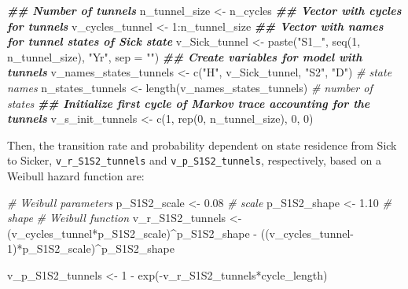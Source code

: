 \documentclass[
]{article}
\newenvironment{Shaded}{\begin{snugshade}}{\end{snugshade}}
\newcommand{\AttributeTok}[1]{\textcolor[rgb]{0.77,0.63,0.00}{#1}}
\newcommand{\CommentTok}[1]{\textcolor[rgb]{0.56,0.35,0.01}{\textit{#1}}}
\newcommand{\DecValTok}[1]{\textcolor[rgb]{0.00,0.00,0.81}{#1}}
\newcommand{\DocumentationTok}[1]{\textcolor[rgb]{0.56,0.35,0.01}{\textbf{\textit{#1}}}}
\newcommand{\FloatTok}[1]{\textcolor[rgb]{0.00,0.00,0.81}{#1}}
\newcommand{\FunctionTok}[1]{\textcolor[rgb]{0.00,0.00,0.00}{#1}}
\newcommand{\NormalTok}[1]{#1}
\newcommand{\OtherTok}[1]{\textcolor[rgb]{0.56,0.35,0.01}{#1}}
\newcommand{\SpecialCharTok}[1]{\textcolor[rgb]{0.00,0.00,0.00}{#1}}
\newcommand{\StringTok}[1]{\textcolor[rgb]{0.31,0.60,0.02}{#1}}
\begin{document}
\begin{Shaded}
\begin{Highlighting}[]
\DocumentationTok{\#\# Number of tunnels}
\NormalTok{n\_tunnel\_size }\OtherTok{\textless{}{-}}\NormalTok{ n\_cycles }
\DocumentationTok{\#\# Vector with cycles for tunnels}
\NormalTok{v\_cycles\_tunnel }\OtherTok{\textless{}{-}} \DecValTok{1}\SpecialCharTok{:}\NormalTok{n\_tunnel\_size}
\DocumentationTok{\#\# Vector with names for tunnel states of Sick state}
\NormalTok{v\_Sick\_tunnel }\OtherTok{\textless{}{-}} \FunctionTok{paste}\NormalTok{(}\StringTok{"S1\_"}\NormalTok{, }\FunctionTok{seq}\NormalTok{(}\DecValTok{1}\NormalTok{, n\_tunnel\_size), }\StringTok{"Yr"}\NormalTok{, }\AttributeTok{sep =} \StringTok{""}\NormalTok{)}
\DocumentationTok{\#\# Create variables for model with tunnels}
\NormalTok{v\_names\_states\_tunnels }\OtherTok{\textless{}{-}} \FunctionTok{c}\NormalTok{(}\StringTok{"H"}\NormalTok{, v\_Sick\_tunnel, }\StringTok{"S2"}\NormalTok{, }\StringTok{"D"}\NormalTok{) }\CommentTok{\# state names}
\NormalTok{n\_states\_tunnels }\OtherTok{\textless{}{-}} \FunctionTok{length}\NormalTok{(v\_names\_states\_tunnels)         }\CommentTok{\# number of states}
\DocumentationTok{\#\# Initialize first cycle of Markov trace accounting for the tunnels}
\NormalTok{v\_s\_init\_tunnels }\OtherTok{\textless{}{-}} \FunctionTok{c}\NormalTok{(}\DecValTok{1}\NormalTok{, }\FunctionTok{rep}\NormalTok{(}\DecValTok{0}\NormalTok{, n\_tunnel\_size), }\DecValTok{0}\NormalTok{, }\DecValTok{0}\NormalTok{) }
\end{Highlighting}
\end{Shaded}

Then, the transition rate and probability dependent on state residence from Sick to Sicker, \texttt{v\_r\_S1S2\_tunnels} and \texttt{v\_p\_S1S2\_tunnels}, respectively, based on a Weibull hazard function are:

\begin{Shaded}
\begin{Highlighting}[]
\CommentTok{\# Weibull parameters}
\NormalTok{p\_S1S2\_scale }\OtherTok{\textless{}{-}} \FloatTok{0.08} \CommentTok{\# scale}
\NormalTok{p\_S1S2\_shape }\OtherTok{\textless{}{-}} \FloatTok{1.10} \CommentTok{\# shape}
\CommentTok{\# Weibull function}
\NormalTok{v\_r\_S1S2\_tunnels }\OtherTok{\textless{}{-}}\NormalTok{ (v\_cycles\_tunnel}\SpecialCharTok{*}\NormalTok{p\_S1S2\_scale)}\SpecialCharTok{\^{}}\NormalTok{p\_S1S2\_shape }\SpecialCharTok{{-}}
\NormalTok{                    ((v\_cycles\_tunnel}\DecValTok{{-}1}\NormalTok{)}\SpecialCharTok{*}\NormalTok{p\_S1S2\_scale)}\SpecialCharTok{\^{}}\NormalTok{p\_S1S2\_shape}
                    
\NormalTok{v\_p\_S1S2\_tunnels }\OtherTok{\textless{}{-}} \DecValTok{1} \SpecialCharTok{{-}} \FunctionTok{exp}\NormalTok{(}\SpecialCharTok{{-}}\NormalTok{v\_r\_S1S2\_tunnels}\SpecialCharTok{*}\NormalTok{cycle\_length)}
\end{Highlighting}
\end{Shaded}
\end{document}
